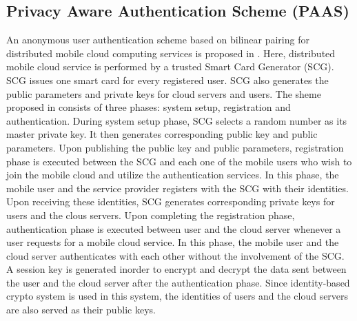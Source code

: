 \documentclass[10pt,a4paper,journal]{IEEEtran}
\begin{document}
\subsection{Privacy Aware Authentication Scheme (PAAS)}
An anonymous user authentication scheme based on bilinear pairing for distributed mobile cloud computing services is proposed in \cite{5}. Here, distributed mobile cloud service is performed by a trusted Smart Card Generator (SCG). SCG issues one smart card for every registered user. SCG also generates the public parameters and private keys for cloud servers and users. The sheme proposed in \cite{5} consists of three phases: system setup, registration and authentication. During system setup phase, SCG selects a random number as its master private key. It then generates corresponding public key and public parameters. Upon publishing the public key and public parameters, registration phase is executed between the SCG and each one of the mobile users who wish to join the mobile cloud and utilize the authentication services. In this phase, the mobile user and the service provider registers with the SCG with their identities. Upon receiving these identities, SCG generates corresponding private keys for users and the clous servers. Upon completing the registration phase, authentication phase is executed between user and the cloud server whenever a user requests for a mobile cloud service. In this phase, the mobile user and the cloud server authenticates with each other without the involvement of the SCG. A session key is generated inorder to encrypt and decrypt the data sent between the user and the cloud server after the authentication phase. Since identity-based crypto system is used in this system, the identities of users and the cloud servers are also served as their public keys.  
\end{document}
